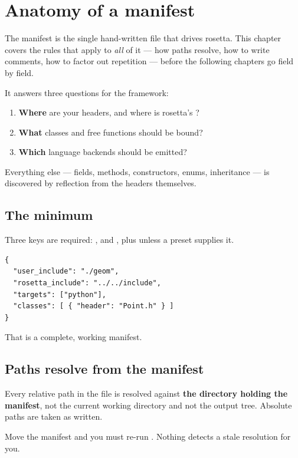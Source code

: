 \chapter{Anatomy of a manifest}
\label{ch:manifest}

The manifest is the single hand-written file that drives rosetta. This chapter
covers the rules that apply to \emph{all} of it --- how paths resolve, how to
write comments, how to factor out repetition --- before the following chapters
go field by field.

It answers three questions for the framework:

\begin{enumerate}
  \item \textbf{Where} are your headers, and where is rosetta's ?
  \item \textbf{What} classes and free functions should be bound?
  \item \textbf{Which} language backends should be emitted?
\end{enumerate}

Everything else --- fields, methods, constructors, enums, inheritance --- is
discovered by reflection from the headers themselves.

\section{The minimum}

Three keys are required: ,  and
, plus  unless a preset supplies it.

\begin{lstlisting}[style=json]
{
  "user_include": "./geom",
  "rosetta_include": "../../include",
  "targets": ["python"],
  "classes": [ { "header": "Point.h" } ]
}
\end{lstlisting}

That is a complete, working manifest.

\section{Paths resolve from the manifest}

Every relative path in the file is resolved against \textbf{the directory
holding the manifest}, not the current working directory and not the output
tree. Absolute paths are taken as written.

\begin{warn}
Move the manifest and you must re-run . Nothing detects a
stale resolution for you.
\end{warn}

